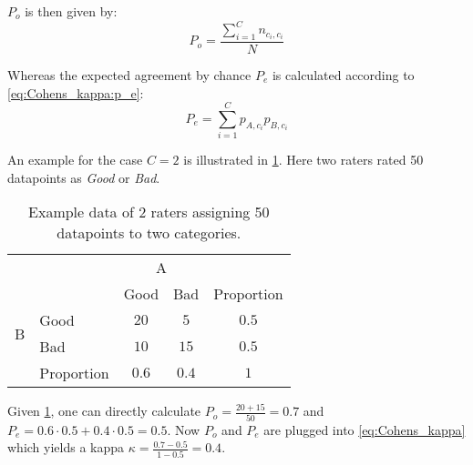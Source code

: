$P_o$ is then given by: %
\begin{equation}\label{eq:Cohens_kappa:p_o}
    P_o = \frac{\sum_{i=1}^{C} n_{c_i, c_i}}{N}
\end{equation}

Whereas the expected agreement by chance $P_e$ is calculated according to \cref{eq:Cohens_kappa:p_e}:
\begin{equation}\label{eq:Cohens_kappa:p_e}
    P_e = \sum_{i=1}^{C} p_{A, c_i} p_{B, c_i}
\end{equation}

An example for the case $C=2$ is illustrated in \cref{tab:cohens_kappa_sample_data}.
Here two raters rated 50 datapoints as \textit{Good} or \textit{Bad}.

\begin{table}[htpb]
    \centering
    \begin{tabular}{l|l|c|c|c}
        \multicolumn{2}{c}{}&\multicolumn{2}{c}{A}&\\
        \cline{3-4}
        \multicolumn{2}{c|}{}&Good&Bad&\multicolumn{1}{c}{Proportion}\\
        \cline{2-4}
        \multirow{2}{*}{B}& Good & $20$ & $5$ & $0.5$\\
        \cline{2-4}
        & Bad & $10$ & $15$ & $0.5$\\
        \cline{2-4}
        \multicolumn{1}{c}{} & \multicolumn{1}{c}{Proportion} & \multicolumn{1}{c}{$0.6$} & \multicolumn{    1}{c}{$0.4$} & \multicolumn{1}{c}{$1$}\\
    \end{tabular}
    \caption[Cohen's Kappa sample data]{Example data of 2 raters assigning 50 datapoints to two categories.}\label{tab:cohens_kappa_sample_data}
\end{table}

Given \cref{tab:cohens_kappa_sample_data}, one can directly calculate $P_o = \frac{ 20 + 15 }{50} = 0.7$ and $P_e = 0.6 \cdot 0.5 + 0.4 \cdot 0.5 = 0.5$.
Now $P_o$ and $P_e$ are plugged into \cref{eq:Cohens_kappa} which yields a kappa $\kappa = \frac{0.7 - 0.5}{1 - 0.5} = 0.4$.
